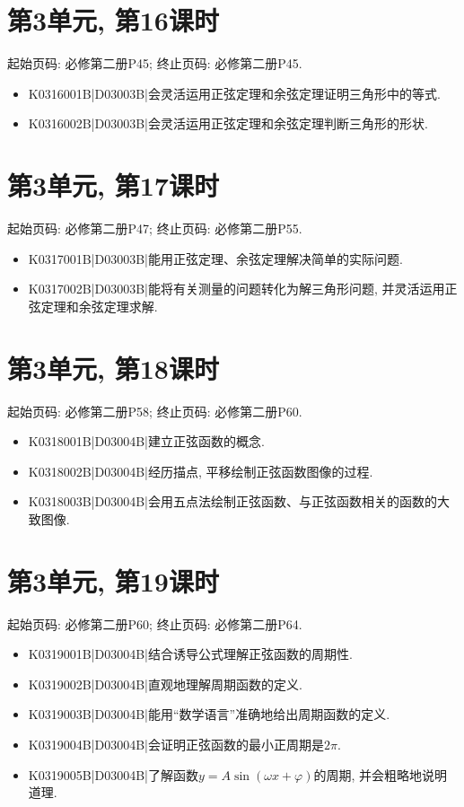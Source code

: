 \section*{第3单元, 第16课时}
起始页码: 必修第二册P45; 终止页码: 必修第二册P45.
\begin{itemize}
\item K0316001B|D03003B|会灵活运用正弦定理和余弦定理证明三角形中的等式.
\item K0316002B|D03003B|会灵活运用正弦定理和余弦定理判断三角形的形状.
\end{itemize}

\section*{第3单元, 第17课时}
起始页码: 必修第二册P47; 终止页码: 必修第二册P55.
\begin{itemize}
\item K0317001B|D03003B|能用正弦定理、余弦定理解决简单的实际问题.
\item K0317002B|D03003B|能将有关测量的问题转化为解三角形问题, 并灵活运用正弦定理和余弦定理求解.
\end{itemize}

\section*{第3单元, 第18课时}
起始页码: 必修第二册P58; 终止页码: 必修第二册P60.
\begin{itemize}
\item K0318001B|D03004B|建立正弦函数的概念.
\item K0318002B|D03004B|经历描点, 平移绘制正弦函数图像的过程.
\item K0318003B|D03004B|会用五点法绘制正弦函数、与正弦函数相关的函数的大致图像.
\end{itemize}

\section*{第3单元, 第19课时}
起始页码: 必修第二册P60; 终止页码: 必修第二册P64.
\begin{itemize}
\item K0319001B|D03004B|结合诱导公式理解正弦函数的周期性.
\item K0319002B|D03004B|直观地理解周期函数的定义.
\item K0319003B|D03004B|能用``数学语言''准确地给出周期函数的定义.
\item K0319004B|D03004B|会证明正弦函数的最小正周期是$2\pi$.
\item K0319005B|D03004B|了解函数$y=A\sin(\omega x+\varphi)$的周期, 并会粗略地说明道理.
\end{itemize}

